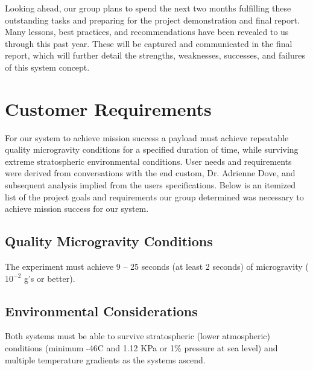 \indent\indent Looking ahead, our group plans to spend the next two months fulfilling these outstanding tasks and preparing for the project demonstration and final report. Many lessons, best practices, and recommendations have been revealed to us through this past year. These will be captured and communicated in the final report, which will further detail the strengths, weaknesses, successes, and failures of this system concept. 


\appendix

\section{Customer Requirements}

\indent\indent For our system to achieve mission success a payload must achieve repeatable quality microgravity conditions for a specified duration of time, while surviving extreme stratospheric environmental conditions. User needs and requirements were derived from conversations with the end custom, Dr. Adrienne Dove, and subsequent analysis implied from the users specifications. Below is an itemized list of the project goals and requirements our group determined was necessary to achieve mission success for our system. 

\subsection{Quality Microgravity Conditions}

\indent\indent The experiment must achieve 9 – 25 seconds (at least 2 seconds) of microgravity ($10^{\minus 2}$ g’s or better).


\subsection{Environmental Considerations}

\indent\indent Both systems must be able to survive stratospheric (lower atmospheric) conditions (minimum -46\degree C and 1.12 KPa or 1\% pressure at sea level) and multiple temperature gradients as the systems ascend.


